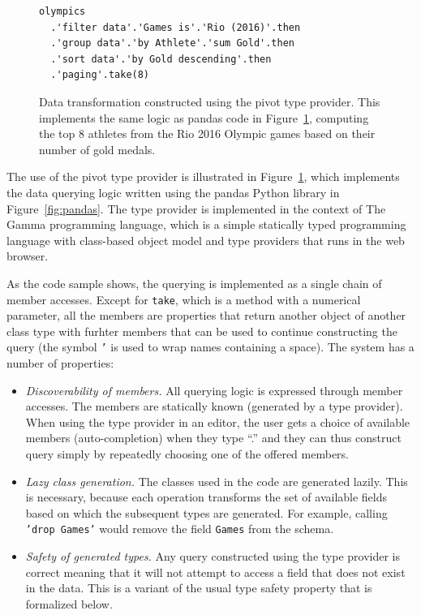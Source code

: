 \documentclass[fleqn,11pt]{report}
\theoremstyle{definition}
\newenvironment{nitemize}
{ \vspace{-0.4em}
  \begin{itemize}
    \setlength{\itemsep}{5pt}
    \setlength{\parskip}{0pt}
    \setlength{\parsep}{0pt} }
{ \end{itemize}
  \vspace{-0.4em} }
\begin{document}
\begin{figure}[t]
\vspace{-0.5em}
\begin{lstlisting}[language=sharp]
olympics
  .'filter data'.'Games is'.'Rio (2016)'.then
  .'group data'.'by Athlete'.'sum Gold'.then
  .'sort data'.'by Gold descending'.then
  .'paging'.take(8)
\end{lstlisting}
\vspace{-0.25em}
\caption{Data transformation constructed using the pivot type provider. This implements the
same logic as pandas code in Figure~\ref{fig:rio}, computing the top 8 athletes from the Rio 2016
Olympic games based on their number of gold medals.}
\label{fig:rio}
\vspace{-0.25em}
\end{figure}

The use of the pivot type provider is illustrated in Figure~\ref{fig:rio}, which implements
the data querying logic written using the pandas Python library in Figure~\ref{fig:pandas}.
The type provider is implemented in the context of The Gamma programming language, which is a
simple statically typed programming language with class-based object model and type providers
that runs in the web browser.

As the code sample shows, the querying is implemented as a single chain of member accesses.
Except for \texttt{take}, which is a method with a numerical parameter, all the members are
properties that return another object of another class type with furhter members that can be
used to continue constructing the query (the symbol \texttt{'} is used to wrap names containing
a space). The system has a number of properties:

\begin{nitemize}
\item \emph{Discoverability of members.} All querying logic is expressed through member accesses.
  The members are statically known (generated by a type provider). When using the type provider in
  an editor, the user gets a choice of available members (auto-completion) when they type ``.''
  and they can thus construct query simply by repeatedly choosing one of the offered members.

\item \emph{Lazy class generation.} The classes used in the code are generated lazily. This is
  necessary, because each operation transforms the set of available fields based on which the
  subsequent types are generated. For example, calling \texttt{'drop Games'} would remove the field
  \texttt{Games} from the schema.

\item \emph{Safety of generated types.} Any query constructed using the type provider is correct meaning that it
  will not attempt to access a field that does not exist in the data. This is a variant of the
  usual type safety property that is formalized below.
\end{nitemize}
\end{document}
